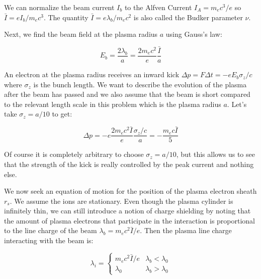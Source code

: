 \documentclass[aps,prl,preprint,groupedaddress]{revtex4-1}
\begin{document}
We can normalize the beam current $I_b$ to the Alfven Current $I_A = m_e c^3/e$ so $\bar{I} = e I_b /m_e c^3$. The quantity $\bar{I} = e \lambda_b/m_e c^2$ is also called the Budker parameter $\nu$. 

Next, we find the beam field at the plasma radius $a$ using Gauss's law:

\begin{equation}\label{eq:E_beam}
E_b = \frac{2 \lambda_b}{a} = \frac{2m_e c^2}{e} \frac{\bar{I}}{a}
\end{equation}

An electron at the plasma radius receives an inward kick $\Delta p = F \Delta t = -e E_b \sigma_z/c$ where $\sigma_z$ is the bunch length. We want to describe the evolution of the plasma after the beam has passed and we also assume that the beam is short compared to the relevant length scale in this problem which is the plasma radius $a$. Let's take $\sigma_z = a/10$ to get:

\begin{equation}\label{eq:norm_kick}
\Delta p = -e \frac{2m_e c^2 \bar{I}}{e}\frac{\sigma_z/c}{a} = -\frac{m_e c \bar{I}}{5}
\end{equation}  

Of course it is completely arbitrary to choose $\sigma_z = a/10$, but this allows us to see that the strength of the kick is really controlled by the peak current and nothing else. 


We now seek an equation of motion for the position of the plasma electron sheath $r_s$. We assume the ions are stationary. Even though the plasma cylinder is infinitely thin, we can still introduce a notion of charge shielding by noting that the amount of plasma electrons that participate in the interaction is proportional to the line charge of the beam $\lambda_b = m_e c^2 \bar{I}/e$. Then the plasma line charge interacting with the beam is:

\begin{equation}\label{eq:part_charge}
\lambda_i = \left\{ \begin{array}{lr}
m_e c^2 \bar{I}/e & \lambda_b < \lambda_0 \\
\lambda_0 & \lambda_b > \lambda_0
\end{array} \right.
\end{equation}
\end{document}

